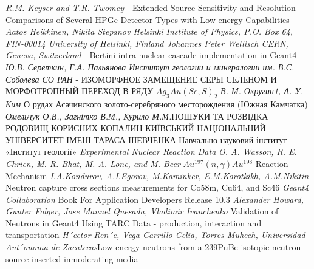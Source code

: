 \documentclass[a4paper, 14pt]{article}
\numberwithin{equation}{section}
\numberwithin{table}{section}
\begin{document}
	\pagebreak
	\newpage	
	\begin{thebibliography}{}
		
		 \textit{R.M. Keyser and T.R. Twomey} - Extended Source Sensitivity and Resolution Comparisons of Several HPGe Detector Types with Low-energy Capabilities 
		 \textit{Aatos Heikkinen, Nikita Stepanov Helsinki Institute of Physics, P.O. Box 64, FIN-00014 University of Helsinki, Finland Johannes Peter Wellisch CERN, Geneva, Switzerland} - Bertini intra-nuclear cascade implementation in Geant4 
		 \textit{Ю.В. Сереткин, Г.А. Пальянова Институт геологии и минералогии им. В.С. Соболева СО РАН} - ИЗОМОРФНОЕ ЗАМЕЩЕНИЕ СЕРЫ СЕЛЕНОМ И МОРФОТРОПНЫЙ ПЕРЕХОД В РЯДУ $Ag_3Au(Se,S)_2$ 	
		 \textit{В. М. Округин1, А. У. Ким} О рудах Асачинского золото-серебряного месторождения
		(Южная Камчатка)
		 \textit{Омельчук О.В., Загнітко В.М., Курило М.М.}ПОШУКИ ТА РОЗВІДКА РОДОВИЩ КОРИСНИХ КОПАЛИН КИЇВСЬКИЙ НАЦІОНАЛЬНИЙ УНІВЕРСИТЕТ ІМЕНІ ТАРАСА ШЕВЧЕНКА Навчально-науковий інститут «Інститут геології»
		 \textit{Experimental Nuclear Reaction Data}
		 \textit{O. A. Wasson, R. E. Chrien, M. R. Bhat, M. A. Lone, and M. Beer} $Au^{197}(n, \gamma)Au^{198}$ Reaction Mechanism 
		 \textit{	I.A.Kondurov, A.I.Egorov, M.Kaminker, E.M.Korotkikh, A.M.Nikitin}  Neutron capture cross sections measurements for Co58m, Cu64, and Sc46
		 \textit{ Geant4 Collaboration } Book For Application Developers
		Release 10.3
		 \textit{ Alexander Howard, Gunter Folger, Jose Manuel Quesada, Vladimir Ivanchenko} Validation of Neutrons in Geant4 Using TARC Data - production, interaction and transportation
		 \textit{H´ector Ren´e, Vega-Carrillo Celia, Torres-Muhech, Universidad Aut´onoma de Zacatecas}Low energy neutrons from a 239PuBe isotopic neutron source inserted inmoderating media
		
	\end{thebibliography}
	
\end{document}
